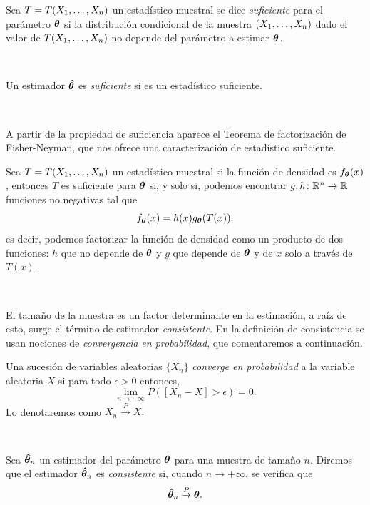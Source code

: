 \documentclass[oneside,openright,titlepage,numbers=noenddot,openany,headinclude,footinclude=true,
cleardoublepage=empty,abstractoff,BCOR=5mm,paper=a4,fontsize=12pt,main=spanish]{scrreprt}
\begin{document}
\begin{definition}
Sea $T=T(X_1,\dots,X_n)$ un estadístico muestral se dice \textit{suficiente} para el parámetro $\bm{\theta}$ si la distribución condicional de la muestra $(X_1,\dots,X_n)$ dado el valor de $T(X_1,\dots,X_n)$ no depende del parámetro a estimar $\bm{\theta}$.
\end{definition}\


\begin{definition}
Un estimador $\bm{\hat{\theta}}$ es \textit{suficiente} si es un estadístico suficiente.
\end{definition}\

A partir de la propiedad de suficiencia aparece el Teorema de factorización de Fisher-Neyman, que nos ofrece una caracterización de estadístico suficiente.\\


\begin{theorem}
Sea $T=T(X_1,\dots,X_n)$ un estadístico muestral si la función de densidad es $f_{\bm{\theta}}(x)$, entonces $T$ es suficiente para $\bm{\theta}$ si, y solo si, podemos encontrar $g,h\colon \mathbb{R}^n \to \mathbb{R}$ funciones no negativas tal que $$f_{\bm{\theta}}(x)=h(x)g_{\bm{\theta}}(T(x)).$$
es decir, podemos factorizar la función de densidad como un producto de dos funciones: $h$ que no depende de $\bm{\theta}$ y $g$ que depende de $\bm{\theta}$ y de $x$ solo a través de $T(x)$.
\end{theorem}\

El tamaño de la muestra es un factor determinante en la estimación, a raíz de esto, surge el término de estimador \textit{consistente}. En la definición de consistencia se usan nociones de \textit{convergencia en probabilidad}, que comentaremos a continuación.\\

\begin{definition}
Una sucesión de variables aleatorias $\{X_n\}$ \textit{converge en probabilidad} a la variable aleatoria $X$ si para todo $\epsilon>0$ entonces, $$\lim_{n\to +\infty}P([X_n-X]>\epsilon)=0.$$
Lo denotaremos como $X_n \overset{P}{\to} X.$
\end{definition}\

\begin{definition}
Sea $\bm{\hat{\theta}}_n$ un estimador del parámetro $\bm{\theta}$ para una muestra de tamaño $n$. Diremos que el estimador $\bm{\hat{\theta}}_n$ es \textit{consistente} si, cuando $n\to +\infty$, se verifica que $$\bm{\hat{\theta}}_n \overset{P}{\to} \bm{\theta}.$$
\end{definition}\
\end{document}
